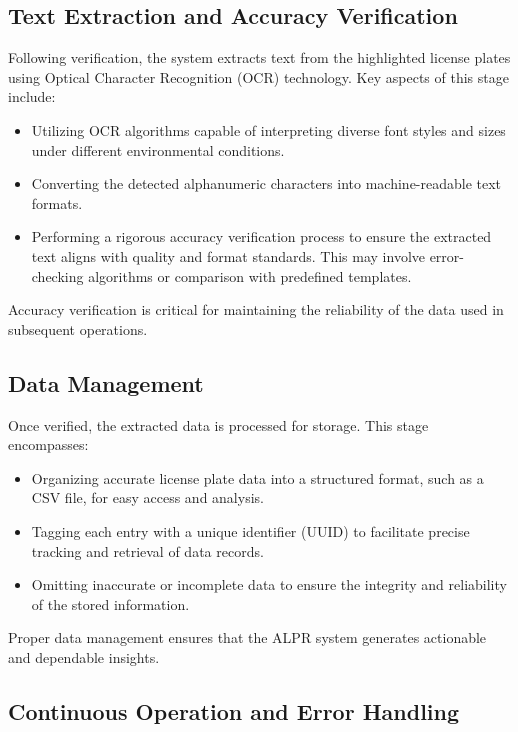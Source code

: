 \subsection{Text Extraction and Accuracy Verification}

Following verification, the system extracts text from the highlighted license plates using Optical Character Recognition (OCR) technology. Key aspects of this stage include:
\begin{itemize}
	\item Utilizing OCR algorithms capable of interpreting diverse font styles and sizes under different environmental conditions.
	\item Converting the detected alphanumeric characters into machine-readable text formats.
	\item Performing a rigorous accuracy verification process to ensure the extracted text aligns with quality and format standards. This may involve error-checking algorithms or comparison with predefined templates.
\end{itemize}
Accuracy verification is critical for maintaining the reliability of the data used in subsequent operations.

\subsection{Data Management}

Once verified, the extracted data is processed for storage. This stage encompasses:
\begin{itemize}
	\item Organizing accurate license plate data into a structured format, such as a CSV file, for easy access and analysis.
	\item Tagging each entry with a unique identifier (UUID) to facilitate precise tracking and retrieval of data records.
	\item Omitting inaccurate or incomplete data to ensure the integrity and reliability of the stored information.
\end{itemize}
Proper data management ensures that the ALPR system generates actionable and dependable insights.

\subsection{Continuous Operation and Error Handling}

